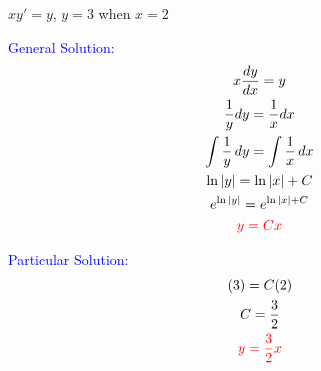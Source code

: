     \item $xy'=y$, $y = 3$ when $x = 2$
    
    \textcolor{blue}{
    \begin{minipage}[t]{0.45\textwidth}
        General Solution:
        \begin{gather*}
            x\frac{dy}{dx} = y \\
            \frac{1}{y}dy = \frac{1}{x}dx \\
            \int \frac{1}{y} \, dy = \int \frac{1}{x} \, dx \\
            \ln|y| = \ln|x| + C \\
            e^{\ln|y|} = e^{\ln|x|+C} \\
            \textcolor{red}{
            y = Cx     
            }
        \end{gather*}
    \end{minipage}
    \hfill
    \begin{minipage}[t]{0.45\textwidth}
        Particular Solution:
        \begin{gather*}
            (3) = C(2) \\
            C = \frac{3}{2} \\
            \textcolor{red}{
            y = \frac{3}{2}x  
            }
        \end{gather*}
    \end{minipage}
    }